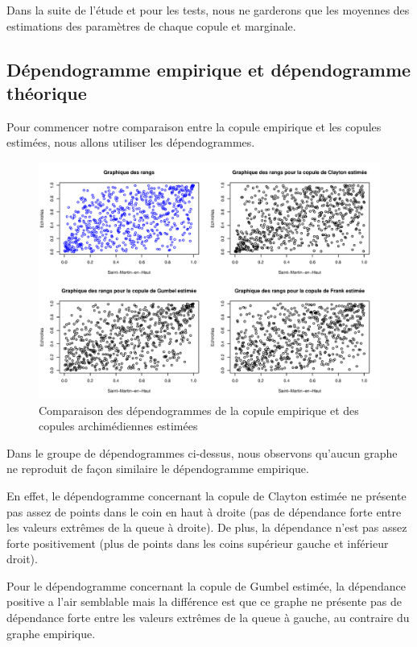 Dans la suite de l'étude et pour les tests, nous ne garderons que les moyennes des estimations des paramètres de chaque copule et marginale.

\subsection{Dépendogramme empirique et dépendogramme théorique}

Pour commencer notre comparaison entre la copule empirique et les copules estimées, nous allons utiliser les dépendogrammes.

\noindent%
\begin{figure}[H]
    \begin{center}
      \includegraphics[width=17 cm, angle=0]{./pictures/dependarch.png}
      \centering\caption{\label{2}Comparaison des dépendogrammes de la copule empirique et des copules archimédiennes estimées}
    \end{center}
\end{figure}

Dans le groupe de dépendogrammes ci-dessus, nous observons qu'aucun graphe ne reproduit de façon similaire le dépendogramme empirique. 

En effet, le dépendogramme concernant la copule de Clayton estimée ne présente pas assez de points dans le coin en haut à droite (pas de dépendance forte entre les valeurs extrêmes de la queue à droite). De plus, la dépendance n'est pas assez forte positivement (plus de points dans les coins supérieur gauche et inférieur droit).

Pour le dépendogramme concernant la copule de Gumbel estimée, la dépendance positive a l'air semblable mais la différence est que ce graphe ne présente pas de dépendance forte entre les valeurs extrêmes de la queue à gauche, au contraire du graphe empirique.

